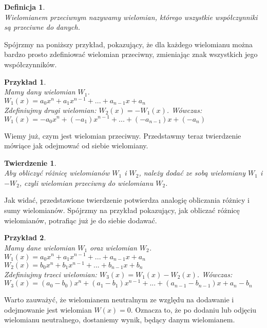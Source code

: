 \documentclass[twoside,a4paper]{book}
\newtheorem{theorem}{Twierdzenie}
\newtheorem{definition}{Definicja}
\newtheorem{example}{Przykład}
\begin{document}
\begin{definition}
	$ $\\
	Wielomianem przeciwnym nazywamy wielomian, którego wszystkie współczynniki są przeciwne do danych.
\end{definition}

Spójrzmy na poniższy przykład, pokazujący, że dla każdego wielomianu można bardzo prosto zdefiniować wielomian przeciwny, zmieniając znak wszystkich jego współczynników.

\begin{example}
	$ $\\
	Mamy dany wielomian $W_1$. \\
	$W_1(x) = a_0x^n + a_1x^{n-1} + ... + a_{n-1}x + a_n$ \\
	Zdefiniujmy drugi wielomian: $W_2(x) = -W_1(x)$. Wówczas: \\
	$W_1(x) = -a_0x^n + (-a_1)x^{n-1} + ... + (-a_{n-1})x + (-a_n)$
\end{example}

Wiemy już, czym jest wielomian przeciwny. Przedstawmy teraz twierdzenie mówiące jak odejmować od siebie wielomiany.

\begin{theorem}
	$ $\\
	Aby obliczyć różnicę wielomianów $W_1$ i $W_2$, należy dodać ze sobą wielomiany $W_1$ i $-W_2$, czyli wielomian przeciwny do wielomianu $W_2$.
\end{theorem}

Jak widać, przedstawione twierdzenie potwierdza analogię obliczania różnicy i sumy wielomianów. Spójrzmy na przykład pokazujący, jak obliczać różnicę wielomianów, potrafiąc już je do siebie dodawać.

\begin{example}
	$ $\\
	Mamy dane wielomian $W_1$ oraz wielomian $W_2$.
$W_1(x) = a_0x^n + a_1x^{n-1} + ... + a_{n-1}x + a_n$ \\
$W_2(x) = b_0x^n + b_1x^{n-1} + ... + b_{n-1}x + b_n$ \\
	Zdefiniujmy trzeci wielomian: $W_3(x) = W_1(x) - W_2(x)$. Wówczas: \\
$W_3(x) = (a_0-b_0)x^n + (a_1-b_1)x^{n-1} + ... + (a_{n-1} - b_{n-1})x + a_n - b_n$
\end{example}

Warto zauważyć, że wielomianem neutralnym ze względu na dodawanie i odejmowanie jest wielomian $W(x)=0$. Oznacza to, że po dodaniu lub odjęciu wielomianu neutralnego, dostaniemy wynik, będący danym wielomianem.
\end{document}
